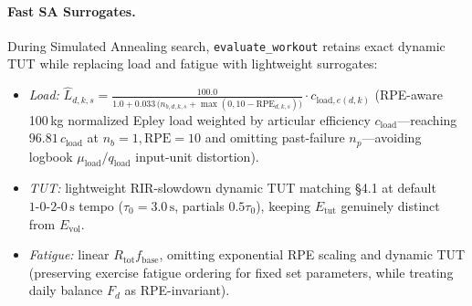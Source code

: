 \documentclass[10pt,twocolumn,letterpaper]{article}
\theoremstyle{plain}
\theoremstyle{definition}
\begin{document}
\paragraph{Fast SA Surrogates.} During Simulated Annealing search, \texttt{evaluate\_workout} retains exact dynamic TUT while replacing load and fatigue with lightweight surrogates:
\begin{itemize}
  \item \emph{Load:} $\hat{L}_{d,k,s} = \frac{100.0}{1.0 + 0.033\,\bigl(n_{b,d,k,s} + \max(0, 10 - \mathrm{RPE}_{d,k,s})\bigr)} \cdot c_{\mathrm{load},e(d,k)}$ (RPE-aware 100\,kg normalized Epley load weighted by articular efficiency $c_{\mathrm{load}}$—reaching $96.81\,c_{\mathrm{load}}$ at $n_b=1, \mathrm{RPE}=10$ and omitting past-failure $n_p$—avoiding logbook $\mu_{\mathrm{load}}/q_{\mathrm{load}}$ input-unit distortion).
  \item \emph{TUT:} lightweight RIR-slowdown dynamic TUT matching \S4.1 at default $1\text{-}0\text{-}2\text{-}0\,\text{s}$ tempo ($\tau_0 = 3.0\,\text{s}$, partials $0.5\tau_0$), keeping $E_{\mathrm{tut}}$ genuinely distinct from $E_{\mathrm{vol}}$.
  \item \emph{Fatigue:} linear $R_{\mathrm{tot}} f_{\mathrm{base}}$, omitting exponential RPE scaling and dynamic TUT (preserving exercise fatigue ordering for fixed set parameters, while treating daily balance $F_d$ as RPE-invariant).
\end{itemize}
\end{document}
